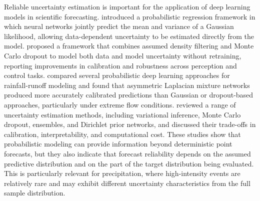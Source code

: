 \documentclass[referee,pdflatex,sn-basic]{sn-jnl}%
\theoremstyle{thmstyleone}%
\theoremstyle{thmstyletwo}%
\theoremstyle{thmstylethree}%
\begin{document}
Reliable uncertainty estimation is important for the application of deep learning models in scientific forecasting. \citet{kendall2017uncertainties} introduced a probabilistic regression framework in which neural networks jointly predict the mean and variance of a Gaussian likelihood, allowing data-dependent uncertainty to be estimated directly from the model. \citet{9001195} proposed a framework that combines assumed density filtering and Monte Carlo dropout to model both data and model uncertainty without retraining, reporting improvements in calibration and robustness across perception and control tasks. \citet{klotz2022uncertainty} compared several probabilistic deep learning approaches for rainfall-runoff modeling and found that asymmetric Laplacian mixture networks produced more accurately calibrated predictions than Gaussian or dropout-based approaches, particularly under extreme flow conditions. \citet{mena2021survey} reviewed a range of uncertainty estimation methods, including variational inference, Monte Carlo dropout, ensembles, and Dirichlet prior networks, and discussed their trade-offs in calibration, interpretability, and computational cost. These studies show that probabilistic modeling can provide information beyond deterministic point forecasts, but they also indicate that forecast reliability depends on the assumed predictive distribution and on the part of the target distribution being evaluated. This is particularly relevant for precipitation, where high-intensity events are relatively rare and may exhibit different uncertainty characteristics from the full sample distribution.
\end{document}
